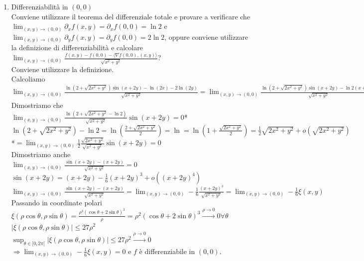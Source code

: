 \documentclass{article}
\begin{document}
\begin{enumerate}
    $\Rightarrow f$ è derivabile in $(0,0)$ e $\nabla f(0,0) =(\ln2,2\ln2)$
    \item Differenziabilità in $(0,0)$\\
    Conviene utilizzare il teorema del differenziale totale e provare a verificare che \\
    $\lim_{(x,y)\rightarrow(0,0)}\partial_xf(x,y)=\partial_xf(0,0)=\ln2$ e $\lim_{(x,y)\rightarrow(0,0)}\partial_y f(x,y)=\partial_y f(0,0)=2 \ln 2$, oppure conviene utilizzare la definizione di differenziabilità e calcolare\\
    $\lim_{(x,y)\rightarrow(0,0)}\frac{f(x,y)-f(0,0)-\langle\nabla f(0,0),(x,y)\rangle}{\sqrt{x^2+y^2}}$?\\
    Conviene utilizzare la definizione.\\
    Calcoliamo \\
    $\lim_{(x,y)\rightarrow(0,0)}\frac{\ln(2+\sqrt{2x^2+y^2})\sin(x+2y)-\ln(2x)-2\ln(2y)}{\sqrt{x^2+y^2}}=\lim_{(x,y)\rightarrow(0,0)}\frac{\ln(2+\sqrt{2x^2+y^2})\sin(x+2y)-\ln2(x+2y)}{\sqrt{x^2+y^2}}=\lim_{(x,y)\rightarrow(0,0)}\frac{1}{\sqrt{x^2+y^2}}\left[ \ln(2+\sqrt{2x^2+y^2})\sin(x+2y)-\ln2\sin(x+2y)+\ln2\sin(x+2y)-\ln2(x+2y) \right]=\lim_{(x,y)\rightarrow(0,0)}\left[ \frac{\ln(2+\sqrt{2x^2+y^2})-\ln 2}{\sqrt{x^2+y^2}}\sin(x+2y) + \ln 2 \frac{\sin(x+2y)-(x+2y)}{\sqrt{x^2+y^2}}\right]$\\
    Dimostriamo che \\
    $\lim_{(x,y)\rightarrow(0,0)}\frac{\ln(2+\sqrt{2x^2+y^2}-\ln2)}{\sqrt{x^2+y^2}}\sin(x+2y)=0$*\\
    $\ln(2+\sqrt{2x^2+y^2})-\ln2=\ln\left( \frac{2+\sqrt{2x^2+y^2}}{2}\right)=\ln=\ln\left(1+\frac{\sqrt{2x^2+y^2}}{2}\right)=\frac{1}{2}\sqrt{2x^2+y^2}+o(\sqrt{2x^2+y^2})$\\
    *$=\lim_{(x,y)\rightarrow(0,0)}\frac{1}{2}\frac{\sqrt{2x^2+y^2}}{\sqrt{x^2+y^2}}\sin(x+2y)=0$\\
    Dimostriamo anche\\
    $\lim_{(x,y)\rightarrow(0,0)}\frac{\sin(x+2y)-(x+2y)}{\sqrt{x^2+y^2}}=0$\\
    $\sin(x+2y)=(x+2y)-\frac{1}{6}(x+2y)^3+o((x+2y)^4)$\\
    $\lim_{(x,y)\rightarrow(0,0)}\frac{\sin(x+2y)-(x+2y)}{\sqrt{x^2+y^2}}=\lim_{(x,y)\rightarrow(0,0)}-\frac{1}{6}\frac{(x+2y)^3}{\sqrt{x^2+y^2}}=\lim_{(x,y)\rightarrow(0,0)}-\frac{1}{6}\xi(x,y)$\\
    Passando in coordinate polari\\
    $\xi(\rho\cos\theta,\rho\sin\theta)=\frac{\rho^3(\cos\theta+2\sin\theta)^3}{\rho}=\rho^2(\cos\theta+2\sin\theta)^3\xrightarrow{\rho\rightarrow 0}0 \forall \theta$\\
    $|\xi(\rho\cos\theta,\rho\sin\theta)|\leq 27\rho^2$\\
    $\sup_{\theta \in [0,2\pi[}|\xi(\rho\cos\theta,\rho\sin\theta)|\leq 27\rho^2\xrightarrow{\rho \rightarrow 0}0$\\
    $\Rightarrow\lim_{(x,y)\rightarrow(0,0)}-\frac{1}{6}\xi(x,y)=0$  e $f$ è differenziabile in $(0,0)$.
\end{enumerate}
\end{document}
